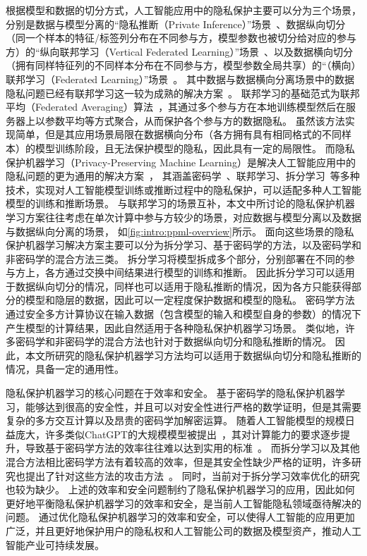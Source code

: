 根据模型和数据的切分方式，人工智能应用中的隐私保护主要可以分为三个场景，分别是数据与模型分离的“隐私推断（Private Inference）”场景~\cite{mann_2023_secure_inference}、数据纵向切分（同一个样本的特征/标签列分布在不同参与方，模型参数也被切分给对应的参与方）的“纵向联邦学习（Vertical Federated Learning）”场景~\cite{liu2024vertical}、以及数据横向切分（拥有同样特征列的不同样本分布在不同参与方，模型参数全局共享）的“（横向）联邦学习（Federated Learning）”场景~\cite{yangqiang2019federated}。
%
%
其中数据与数据横向分离场景中的数据隐私问题已经有联邦学习这一较为成熟的解决方案~\cite{yangqiang2019federated}。
联邦学习的基础范式为联邦平均（Federated Averaging）算法~\cite{mcmahan_2017_fedavg}，其通过多个参与方在本地训练模型然后在服务器上以参数平均等方式聚合，从而保护各个参与方的数据隐私。
%
虽然该方法实现简单，但是其应用场景局限在数据横向分布（各方拥有具有相同格式的不同样本）的模型训练阶段，且无法保护模型的隐私，因此具有一定的局限性。
%
而隐私保护机器学习（Privacy-Preserving Machine Learning）是解决人工智能应用中的隐私问题的更为通用的解决方案~\cite{al_2019_ppml,xu_2021_ppml}，
其涵盖密码学~\cite{evans_2018_pragmatic_mpc}、联邦学习、拆分学习~\cite{vepakomma2018split}等多种技术，实现对人工智能模型训练或推断过程中的隐私保护，可以适配多种人工智能模型的训练和推断场景。
%
与联邦学习的场景互补，本文中所讨论的隐私保护机器学习方案往往考虑在单次计算中参与方较少的场景，对应数据与模型分离以及数据与数据纵向分离的场景，
如\autoref{fig:intro:ppml-overview}所示。
%
面向这些场景的隐私保护机器学习解决方案主要可以分为拆分学习、基于密码学的方法，以及密码学和非密码学的混合方法三类。
%
拆分学习将模型拆成多个部分，分别部署在不同的参与方上，各方通过交换中间结果进行模型的训练和推断。
%
因此拆分学习可以适用于数据纵向切分的情况，同样也可以适用于隐私推断的情况，因为各方只能获得部分的模型和隐层的数据，因此可以一定程度保护数据和模型的隐私。
%
密码学方法通过安全多方计算协议在输入数据（包含模型的输入和模型自身的参数）的情况下产生模型的计算结果，因此自然适用于各种隐私保护机器学习场景。
%
类似地，许多密码学和非密码学的混合方法也针对于数据纵向切分和隐私推断的情况。
%
因此，本文所研究的隐私保护机器学习方法均可以适用于数据纵向切分和隐私推断的情况，具备一定的通用性。


隐私保护机器学习的核心问题在于效率和安全。
%
基于密码学的隐私保护机器学习，能够达到很高的安全性，并且可以对安全性进行严格的数学证明，但是其需要复杂的多方交互计算以及昂贵的密码学加解密运算。
随着人工智能模型的规模日益庞大，许多类似ChatGPT的大规模模型被提出~\cite{chatgpt,touvron_2023_llama,duzhengxiao_2022_glm}，其对计算能力的要求逐步提升，导致基于密码学方法的效率往往难以达到实用的标准~\cite{hou2023ciphergpt}。
%
而拆分学习以及其他混合方法相比密码学方法有着较高的效率，但是其安全性缺少严格的证明，许多研究也提出了针对这些方法的攻击方法~\cite{hezecheng_2019_model_inversion_attack,abuadbba2020can_split,wong_2020_lwe_model}。
同时，当前对于拆分学习效率优化的研究也较为缺少。
%
上述的效率和安全问题制约了隐私保护机器学习的应用，因此如何更好地平衡隐私保护机器学习的效率和安全，是当前人工智能隐私领域亟待解决的问题。
%
通过优化隐私保护机器学习的效率和安全，可以使得人工智能的应用更加广泛，并且更好地保护用户的隐私权和人工智能公司的数据及模型资产，推动人工智能产业可持续发展。


